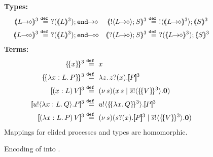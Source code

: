 
\begin{figure}[t]
{\bf Types:}
\begin{align*}
	 \tmap{\shot{L}}{3} & \defeq \shot{\btinp{\tmap{L}{3}} \tinact}
	&
	\tmap{\btout{\shot{L}} S}{3} & \defeq \btout{\tmap{\shot{L}}{3}} \tmap{S}{3}
	\\
	\tmap{\lhot{L}}{3} & \defeq \lhot{\btinp{\tmap{L}{3}} \tinact}
	&
	 \tmap{\btinp{\shot{L}} S}{3} & \defeq \btinp{\tmap{\shot{L}}{3}} \tmap{S}{3}
\end{align*}
	{\bf Terms:}
	\begin{align*}
	\auxmap{x}{3} & \defeq  x
	\\
	\auxmap{\abs{x: L}{P}}{3} & \defeq  \abs{z}{\binp{z}{x} \pmap{P}{3}}
	\\
	\pmap{\appl{(x:L)}{V}}{3} & \defeq \newsp{s}{\appl{x}{s} \Par \bout{\dual{s}}{\auxmap{V}{3}} \inact}
	\\
	\pmap{\bout{u}{\abs{x: L}{Q}} P}{3} & \defeq \bout{u}{\auxmap{\abs{x}{Q}}{3} } \pmap{P}{3}
	\\
	\pmap{\appl{(\abs{x: L}{P})}{V}}{3} & \defeq \newsp{s}{\binp{s}{x} \pmap{P}{3} \Par  \bout{\dual{s}}{\auxmap{V}{3}} \inact}
\end{align*}
Mappings for elided processes and types are homomorphic.
\caption{\label{f:enc:hopip_to_hopi} Encoding of \HOpp into \HOp.}
\end{figure} 
